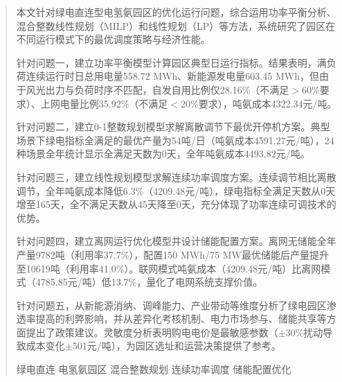 \documentclass[a4paper]{neepumcm}
\begin{document}
\begin{abstract}

本文针对绿电直连型电氢氨园区的优化运行问题，综合运用功率平衡分析、混合整数线性规划（MILP）和线性规划（LP）等方法，系统研究了园区在不同运行模式下的最优调度策略与经济性能。

针对问题一，建立功率平衡模型计算园区典型日运行指标。结果表明，满负荷连续运行时日总用电量558.72 MWh、新能源发电量603.45 MWh，但由于风光出力与负荷时序不匹配，自发自用比例仅28.16\%（不满足$>$60\%要求）、上网电量比例35.92\%（不满足$<$20\%要求），吨氨成本4322.34元/吨。

针对问题二，建立0-1整数规划模型求解离散调节下最优开停机方案。典型场景下绿电指标全满足的最优产量为54吨/日（吨氨成本4591.27元/吨），24种场景全年统计显示全满足天数为0天，全年吨氨成本4493.82元/吨。

针对问题三，建立线性规划模型求解连续功率调度方案。连续调节相比离散调节，全年吨氨成本降低6.3\%（4209.48元/吨），绿电指标全满足天数从0天增至165天，全不满足天数从45天降至0天，充分体现了功率连续可调技术的优势。

针对问题四，建立离网运行优化模型并设计储能配置方案。离网无储能全年产量9782吨（利用率37.7\%），配置150 MWh/75 MW最优储能后产量提升至10619吨（利用率41.0\%）。联网模式吨氨成本（4209.48元/吨）比离网模式（4785.85元/吨）低13.7\%，量化了电网系统支撑价值。

针对问题五，从新能源消纳、调峰能力、产业带动等维度分析了绿电园区渗透率提高的利弊影响，并从差异化考核机制、电力市场参与、储能共享等方面提出了政策建议。灵敏度分析表明购电电价是最敏感参数（$\pm$30\%扰动导致成本变化$\pm$501元/吨），为园区选址和运营决策提供了参考。

\begin{keywords}
绿电直连 \quad 电氢氨园区 \quad 混合整数规划 \quad 连续功率调度 \quad 储能配置优化
\end{keywords}
\end{abstract}

\maketitle
\newpage
\tableofcontents
\clearpage











\end{document}
